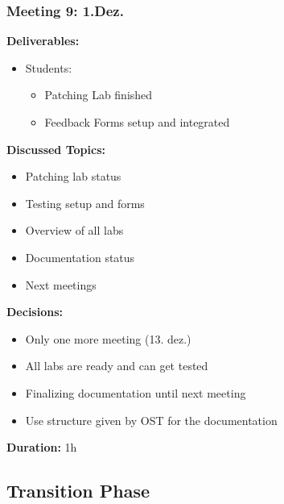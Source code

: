 \subsubsection*{Meeting 9: 1.Dez.}
\textbf{Deliverables:}
\begin{itemize}
    \item Students:
    \begin{itemize}
        \item Patching Lab finished 
        \item Feedback Forms setup and integrated
    \end{itemize}
\end{itemize} 
\textbf{Discussed Topics:}
\begin{itemize}
    \item Patching lab status 
    \item Testing setup and forms
    \item Overview of all labs
    \item Documentation status
    \item Next meetings
\end{itemize}
\textbf{Decisions:}
\begin{itemize}
    \item Only one more meeting (13. dez.)
    \item All labs are ready and can get tested
    \item Finalizing documentation until next meeting
    \item Use structure given by OST for the documentation
\end{itemize}
\textbf{Duration:} 1h

\newpage
\subsection*{Transition Phase}
